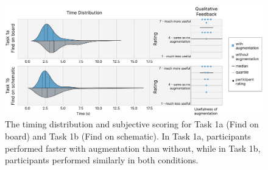 \documentclass [11pt, proquest] {uwthesis}[2020/02/24]
\begin{document}
\begin{figure}
    \centering
    \includegraphics[width=1\linewidth]{ARDW_figures/Study-1/task-1.pdf}
    \caption{The timing distribution and subjective scoring for Task 1a (Find on board) and Task 1b (Find on schematic). In Task 1a, participants
performed faster with augmentation than without, while in Task 1b, participants performed similarly in both conditions.}
    \label{fig:Eval-Part1}
\end{figure}
\end{document}
